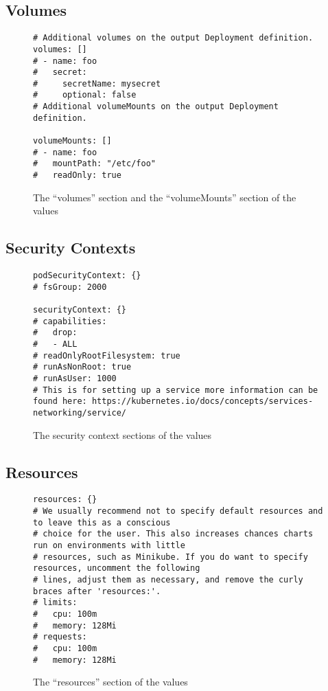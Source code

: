 \documentclass[english,10pt]{scrbook}
\begin{document}
\subsection{Volumes}
\lipsum[2-4] 

\begin{figure}[h]
\begin{verbatim}
# Additional volumes on the output Deployment definition.
volumes: []
# - name: foo
#   secret:
#     secretName: mysecret
#     optional: false
# Additional volumeMounts on the output Deployment definition.

volumeMounts: []
# - name: foo
#   mountPath: "/etc/foo"
#   readOnly: true
\end{verbatim}
\caption{The \enquote{volumes} section and the \enquote{volumeMounts} section of the \gls{values}}\label{code:volumes_section}
\end{figure}
\clearpage

\subsection{Security Contexts}
\lipsum[2-4] 

\begin{figure}[h]
\begin{verbatim}
podSecurityContext: {}
# fsGroup: 2000

securityContext: {}
# capabilities:
#   drop:
#   - ALL
# readOnlyRootFilesystem: true
# runAsNonRoot: true
# runAsUser: 1000
# This is for setting up a service more information can be found here: https://kubernetes.io/docs/concepts/services-networking/service/
\end{verbatim}
\caption{The security context sections of the \gls{values}}\label{code:security_section}
\end{figure}
\clearpage

\subsection{Resources}
\lipsum[2-4] 

\begin{figure}[h]
\begin{verbatim}
resources: {}
# We usually recommend not to specify default resources and to leave this as a conscious
# choice for the user. This also increases chances charts run on environments with little
# resources, such as Minikube. If you do want to specify resources, uncomment the following
# lines, adjust them as necessary, and remove the curly braces after 'resources:'.
# limits:
#   cpu: 100m
#   memory: 128Mi
# requests:
#   cpu: 100m
#   memory: 128Mi
\end{verbatim}
\caption{The \enquote{resources} section of the \gls{values}}\label{code:resources_section}
\end{figure}
\clearpage
\end{document}
